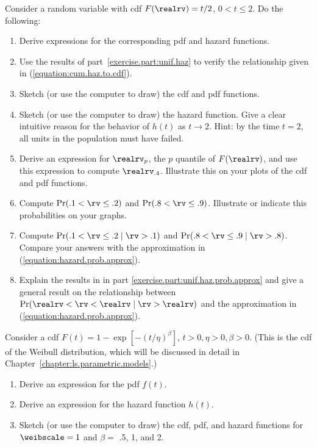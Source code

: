 \begin{exercise}
Consider a random variable with
cdf $F(\realrv)=t/2$, $0 < t \leq 2$. Do the following:
\begin{enumerate}
\item
\label{exercise.part:unif.haz}
Derive expressions for the corresponding pdf and hazard functions.
\item
Use the results of part~\ref{exercise.part:unif.haz} to verify
the relationship given in (\ref{equation:cum.haz.to.cdf}).
\item
Sketch (or use the computer to draw) the cdf and pdf functions.
\item
Sketch (or use the computer to draw) the hazard function.
Give a clear intuitive reason for the behavior of $h(t)$ as
$t \rightarrow 2$. Hint: by the time $t=2$, all units in the
population
must have failed.
\item
Derive an expression for $\realrv_{p}$, the $p$ quantile of $F(\realrv)$,
and use this expression to compute $\realrv_{.4}$. Illustrate this on
your plots of the cdf and pdf functions.
\item
Compute $\Pr(.1 < \rv \leq .2)$ and
$\Pr(.8 < \rv \leq .9)$. Illustrate or indicate this 
probabilities on your graphs. 
\item
\label{exercise.part:unif.haz.prob.approx}
Compute $\Pr(.1 < \rv \leq .2 \mid \rv>.1)$ and
$\Pr(.8 < \rv \leq .9 \mid \rv > .8)$. 
Compare your answers with the approximation in
(\ref{equation:hazard.prob.approx}). 
\item
Explain the results in 
in part \ref{exercise.part:unif.haz.prob.approx}
and give a general result on the relationship 
between 
$\Pr(\realrv< \rv< \realrv \mid \rv>\realrv)$ 
and the approximation in
(\ref{equation:hazard.prob.approx}). 
\end{enumerate}
\end{exercise}


\begin{exercise}
Consider a  cdf $F(t)=1-\exp[-(t/\eta)^{\beta}]$, $t > 0, \eta >0, 
\beta >0$. (This is the cdf of the
Weibull distribution, which will be discussed in detail in
Chapter~\ref{chapter:ls.parametric.models}.)
\begin{enumerate}
\item
Derive an expression for the pdf $f(t)$.
\item
Derive an expression for the hazard function $h(t)$.
\item
Sketch (or use the computer to draw) the cdf, pdf, and hazard
functions
for $\weibscale=1$ and $\beta=$ .5, 1, and 2.
\end{enumerate}
\end{exercise}

